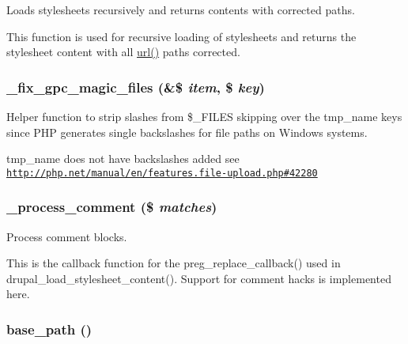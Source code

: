 Loads stylesheets recursively and returns contents with corrected paths.

This function is used for recursive loading of stylesheets and returns the stylesheet content with all \hyperlink{common_8inc_7ef60c766e2d09e18b866dacf6b9eb1f}{url()} paths corrected. \hypertarget{common_8inc_ca820a7438df9d2244148e4b8895291e}{
\subsubsection[{\_\-fix\_\-gpc\_\-magic\_\-files}]{\setlength{\rightskip}{0pt plus 5cm}\_\-fix\_\-gpc\_\-magic\_\-files (\&\$ {\em item}, \/  \$ {\em key})}}
\label{common_8inc_ca820a7438df9d2244148e4b8895291e}


Helper function to strip slashes from \$\_\-FILES skipping over the tmp\_\-name keys since PHP generates single backslashes for file paths on Windows systems.

tmp\_\-name does not have backslashes added see \href{http://php.net/manual/en/features.file-upload.php#42280}{\tt http://php.net/manual/en/features.file-upload.php\#42280} \hypertarget{common_8inc_5e60d91d60360fdbe187b7f7b7b60797}{
\subsubsection[{\_\-process\_\-comment}]{\setlength{\rightskip}{0pt plus 5cm}\_\-process\_\-comment (\$ {\em matches})}}
\label{common_8inc_5e60d91d60360fdbe187b7f7b7b60797}


Process comment blocks.

This is the callback function for the preg\_\-replace\_\-callback() used in drupal\_\-load\_\-stylesheet\_\-content(). Support for comment hacks is implemented here. \hypertarget{common_8inc_e227697e9c239f09fd7e36f71afde771}{
\subsubsection[{base\_\-path}]{\setlength{\rightskip}{0pt plus 5cm}base\_\-path ()}}
\label{common_8inc_e227697e9c239f09fd7e36f71afde771}


